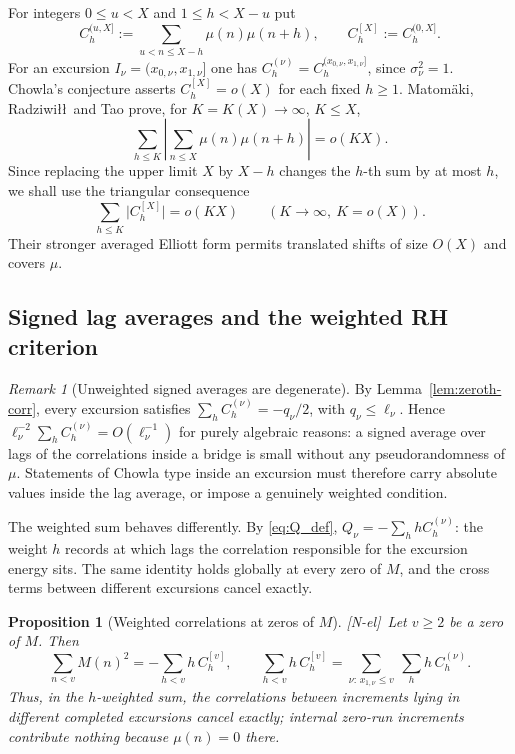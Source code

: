 \documentclass[11pt,reqno]{amsart}
\numberwithin{equation}{section}
\theoremstyle{plain}
\newtheorem{proposition}[theorem]{Proposition}
\theoremstyle{definition}
\theoremstyle{remark}
\newtheorem{remark}[theorem]{Remark}
\newcommand{\tagNE}{\textup{[N-el]}}
\begin{document}
For integers $0\le u<X$ and $1\le h<X-u$ put
\begin{equation}
C^{(u,X]}_h:=\sum_{u<n\le X-h}\mu(n)\mu(n+h),\qquad
C^{[X]}_h:=C^{(0,X]}_h .
\end{equation}
For an excursion $I_\nu=(x_{0,\nu},x_{1,\nu}]$ one has
$C_h^{(\nu)}=C_h^{(x_{0,\nu},x_{1,\nu}]}$, since $\sigma_\nu^2=1$.
Chowla's conjecture asserts $C^{[X]}_h=o(X)$ for each fixed $h\ge1$. Matom\"aki, Radziwi\l\l\ and Tao \cite{MRT15} prove, for
$K=K(X)\to\infty$, $K\le X$,
\begin{equation}
\sum_{h\le K}\left|\sum_{n\le X}\mu(n)\mu(n+h)\right|=o(KX).
\end{equation}
Since replacing the upper limit $X$ by $X-h$ changes the $h$-th sum by at
most $h$, we shall use the triangular consequence
\begin{equation}
\label{eq:MRT}
\sum_{h\le K}\bigl|C^{[X]}_h\bigr|=o(KX)
\qquad(K\to\infty,\ K=o(X)).
\end{equation}
Their stronger averaged Elliott form permits translated shifts of size
$O(X)$ and covers $\mu$.

\subsection{Signed lag averages and the weighted RH criterion}

\begin{remark}[Unweighted signed averages are degenerate]
\label{rem:chowla-degenerate}
By Lemma~\ref{lem:zeroth-corr}, every excursion satisfies
$\sum_hC_h^{(\nu)}=-q_\nu/2$, with $q_\nu\le\ell_\nu$. Hence
$\ell_\nu^{-2}\sum_hC^{(\nu)}_h=O(\ell_\nu^{-1})$ for purely algebraic
reasons: a signed average over lags of the correlations inside a bridge is
small without any pseudorandomness of $\mu$. Statements of Chowla type
inside an excursion must therefore carry absolute values inside the lag
average, or impose a genuinely weighted condition.
\end{remark}

The weighted sum behaves differently. By \eqref{eq:Q_def},
$Q_\nu=-\sum_hhC_h^{(\nu)}$: the weight $h$ records at which lags the
correlation responsible for the excursion energy sits. The same identity
holds globally at every zero of $M$, and the cross terms between different
excursions cancel exactly.

\begin{proposition}[Weighted correlations at zeros of $M$]
\label{prop:weighted-global}
\tagNE\ Let $v\ge2$ be a zero of $M$. Then
\begin{equation}
\label{eq:weighted-global}
\sum_{n<v}M(n)^2=-\sum_{h<v}h\,C^{[v]}_h,
\qquad
\sum_{h<v}h\,C^{[v]}_h=\sum_{\nu:\,x_{1,\nu}\le v}\ \sum_hh\,C^{(\nu)}_h .
\end{equation}
Thus, in the $h$-weighted sum, the correlations between increments lying in
different completed excursions cancel exactly; internal zero-run increments contribute nothing because $\mu(n)=0$ there.
\end{proposition}
\end{document}
